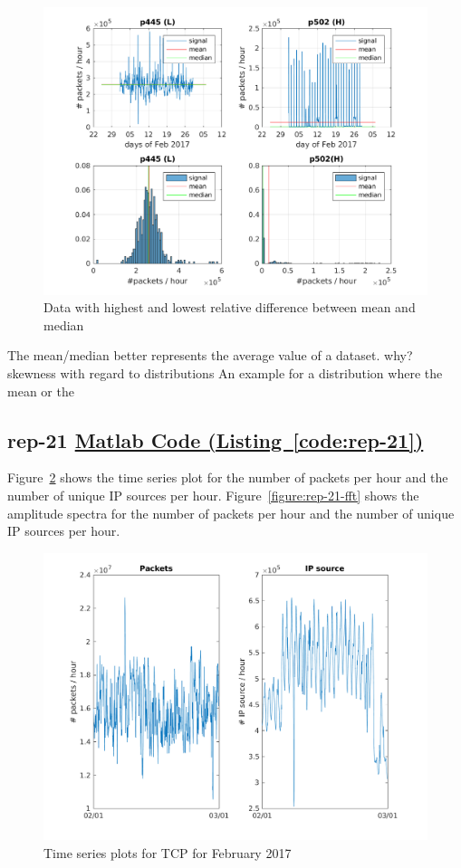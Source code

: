 \documentclass{article}
\newcommand{\codelink}[1]{%
    \hyperref[#1]{\quad\faArrowCircleRight\enskip Matlab Code (Listing~\ref{#1})}%
}
\begin{document}
\begin{figure}[h]
    \centering
    \includegraphics[width=\textwidth]{../exercise-3/plots/rep_20.png}
    \caption{\label{figure:rep-20} Data with highest and lowest relative difference between mean and median}
\end{figure}


The mean/median better represents the average value of a dataset. why? skewness with regard to distributions
An example for a distribution where the mean or the 

\subsection{rep-21 \codelink{code:rep-21}}

Figure~\ref{figure:rep-21-timeseries} shows the time series plot for the number of packets per hour and the
number of unique IP sources per hour.
Figure~\ref{figure:rep-21-fft} shows the amplitude spectra for the number of packets per hour and the
number of unique IP sources per hour.

\begin{figure}[h]
    \centering
    \includegraphics[width=\textwidth]{../exercise-3/plots/rep_21_a}
    \caption{\label{figure:rep-21-timeseries} Time series plots for TCP for February 2017}
\end{figure}
\end{document}
